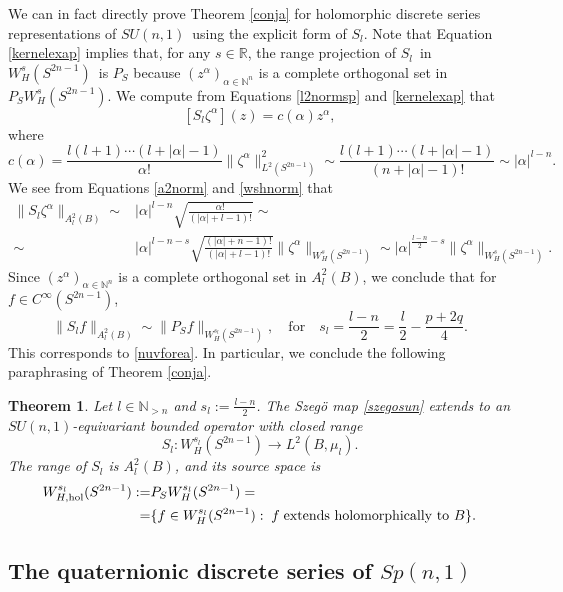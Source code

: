 \documentclass[a4paper,reqno]{amsart}
\numberwithin{equation}{section}
\def\R{\mathbb{R}}
\def\N{\mathbb{N}}
\newtheorem{thm}{Theorem}[section]
\theoremstyle{definition}
\theoremstyle{remark}
\begin{document}
We can in fact directly prove Theorem \ref{conja} for holomorphic discrete series representations of $SU(n,1)$ using the explicit form of $S_l$. Note that Equation \eqref{kernelexap} implies that, for any $s\in \R$, the range projection of $S_l$ in $W^s_H(S^{2n-1})$ is $P_S$ because $(z^\alpha)_{\alpha\in \N^n}$ is a complete orthogonal set in $P_SW^s_H(S^{2n-1})$. We compute from Equations \eqref{l2normsp} and \eqref{kernelexap} that 
$$[S_l\zeta^\alpha](z)=c(\alpha)z^\alpha,$$
where
$$c(\alpha)=\frac{l(l+1)\cdots (l+|\alpha|-1)}{\alpha!}\|\zeta^\alpha\|^2_{L^2(S^{2n-1})}\sim \frac{l(l+1)\cdots (l+|\alpha|-1)}{(n+|\alpha|-1)!}\sim |\alpha|^{l-n}.$$
We see from Equations \eqref{a2norm} and \eqref{wshnorm} that 
\begin{align*}
\|S_l\zeta^\alpha\|_{A^2_l(B)}\sim& |\alpha|^{l-n}\sqrt{\frac{\alpha!}{(|\alpha|+l-1)!}} \sim\\
\sim & |\alpha|^{l-n-s}\sqrt{\frac{(|\alpha|+n-1)!}{(|\alpha|+l-1)!}} \|\zeta^\alpha\|_{W^s_H(S^{2n-1})}\sim |\alpha|^{\frac{l-n}{2}-s} \|\zeta^\alpha\|_{W^s_H(S^{2n-1})}.
\end{align*}
Since $(z^\alpha)_{\alpha\in \N^n}$ is a complete orthogonal set in $A^2_l(B)$, we conclude that for $f\in C^\infty(S^{2n-1})$,
\begin{equation}
\label{lakndaldn}
\|S_lf\|_{A^2_l(B)}\sim \|P_Sf\|_{W^{s_l}_H(S^{2n-1})}, \quad\mbox{for}\quad s_l=\frac{l-n}{2}=\frac{l}{2}-\frac{p+2q}{4}.
\end{equation}
This corresponds to \eqref{nuvforea}. In particular, we conclude the following paraphrasing of Theorem \ref{conja}.

\begin{thm}
Let $l\in \N_{> n}$ and $s_l:=\frac{l-n}{2}$. The Szegö map \eqref{szegosun} extends to an $SU(n,1)$-equivariant bounded operator with closed range
$$S_l:W^{s_l}_H(S^{2n-1})\to L^2(B,\mu_l).$$
The range of $S_l$ is $A^2_l(B)$, and its source space is 
\begin{align*}
W^{s_l}_{H,{\rm hol}}(S^{2n-1}):=&P_SW^{s_l}_{H}(S^{2n-1})=\\
=&\{f\in W^{s_l}_H(S^{2n-1}):\; f\; \mbox{extends holomorphically to $B$}\}.
\end{align*}
\end{thm}



\subsection{The quaternionic discrete series of $Sp(n,1)$}
\end{document}
